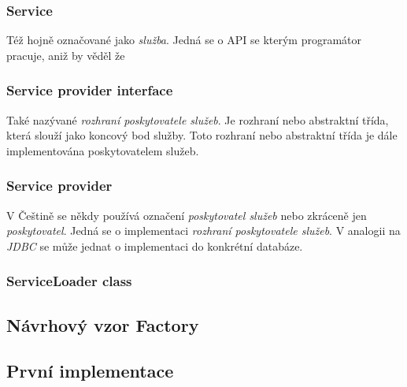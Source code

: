 \subsubsection{Service}
	Též hojně označované jako \textit{služba}. Jedná se o API se kterým programátor pracuje, aniž by věděl že 


\subsubsection{Service provider interface}
	Také nazývané \textit{rozhraní poskytovatele služeb}. Je rozhraní nebo abstraktní třída, která slouží jako koncový bod služby. Toto rozhraní nebo abstraktní třída je dále implementována poskytovatelem služeb.
	
	
\subsubsection{Service provider}
	V Češtině se někdy používá označení \textit{poskytovatel služeb} nebo zkráceně jen \textit{poskytovatel}. Jedná se o implementaci \textit{rozhraní poskytovatele služeb}. V analogii na \textit{JDBC} se může jednat o implementaci do konkrétní databáze.


\subsubsection{ServiceLoader class}




\subsection{Návrhový vzor Factory}



\subsection{První implementace}

	

